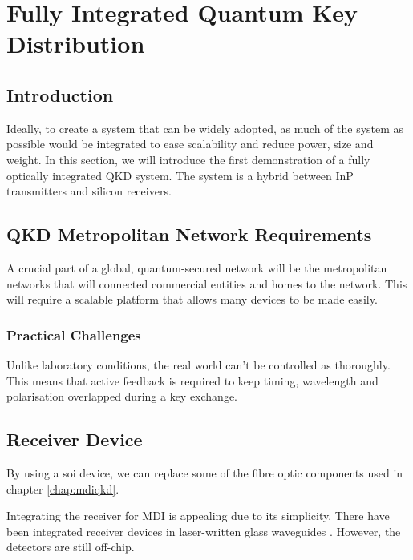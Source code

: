 %
% 
\graphicspath{{./chapters/chapter05/fig05/}}

\let\textcircled=\pgftextcircled
\chapter{Fully Integrated Quantum Key Distribution}
\label{chap:node}

\section{Introduction}

Ideally, to create a system that can be widely adopted, as much of the system as possible would be integrated to ease scalability and reduce power, size and weight. In this section, we will introduce the first demonstration of a fully optically integrated \ac{QKD} system. The system is a hybrid between \ac{InP} transmitters and silicon receivers.

\section{QKD Metropolitan Network Requirements}
\label{sec:sec05}

A crucial part of a global, quantum-secured network will be the metropolitan networks that will connected commercial entities and homes to the network. This will require a scalable platform that allows many devices to be made easily. 

\subsection{Practical Challenges}

Unlike laboratory conditions, the real world can't be controlled as thoroughly. This means that active feedback is required to keep timing, wavelength and polarisation overlapped during a key exchange. 

\section{Receiver Device}

By using a \ac{soi} device, we can replace some of the fibre optic components used in chapter \ref{chap:mdiqkd}.

Integrating the receiver for \ac{MDI} is appealing due to its simplicity. There have been integrated receiver devices in laser-written glass waveguides \cite{wang2019}. However, the detectors are still off-chip.

